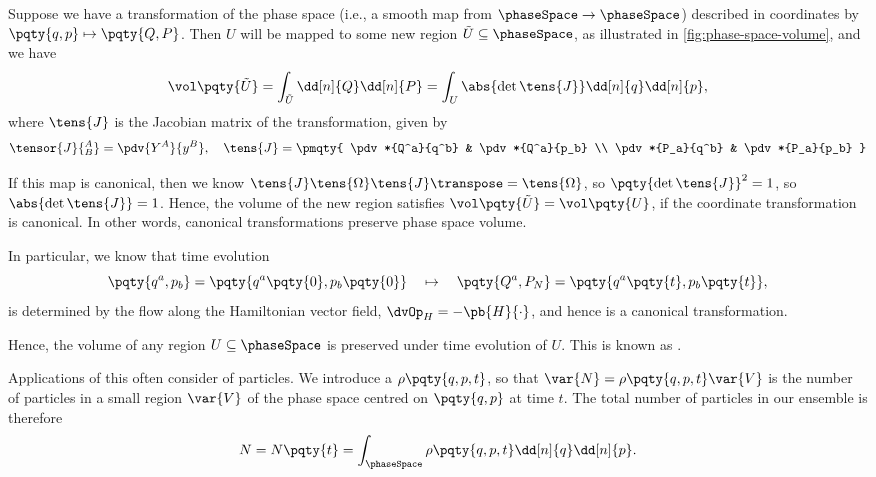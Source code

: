 Suppose we have a transformation of the phase space (i.e., a smooth map from \(\phaseSpace \to \phaseSpace\)) described in coordinates by \(\pqty{q, p} \mapsto \pqty{Q, P}\). Then \(U\) will be mapped to some new region \(\tilde{U} \subseteq \phaseSpace\), as illustrated in \autoref{fig:phase-space-volume}, and we have
\begin{equation}
    \vol\pqty{\tilde{U}} = \int_{\tilde{U}} \dd[n]{Q} \dd[n]{P} = \int_{U} \abs{\det \tens{J}} \dd[n]{q} \dd[n]{p},
\end{equation}
where \(\tens{J}\) is the Jacobian matrix of the transformation, given by
\begin{equation}
    \tensor{J}{^A_B} = \pdv{Y^A}{y^B}, \quad \tens{J} = \pmqty{
        \pdv*{Q^a}{q^b} & \pdv*{Q^a}{p_b} \\
        \pdv*{P_a}{q^b} & \pdv*{P_a}{p_b}
    }
\end{equation}

If this map is canonical, then we know \(\tens{J} \tens{\Omega} \tens{J}\transpose = \tens{\Omega}\), so \(\pqty{\det \tens{J}}^2 = 1\), so \(\abs{\det \tens{J}} = 1\). Hence, the volume of the new region satisfies \(\vol \pqty{\tilde{U}} = \vol\pqty{U}\), if the coordinate transformation is canonical. In other words, canonical transformations preserve phase space volume.

In particular, we know that time evolution
\begin{equation}
    \pqty{q^a, p_b} = \pqty{q^a \pqty{0}, p_b \pqty{0}} \quad \mapsto \quad \pqty{Q^a, P_N} = \pqty{q^a \pqty{t}, p_b \pqty{t}},
\end{equation}
is determined by the flow along the Hamiltonian vector field, \(\dvOp_H = - \pb{H}{\cdot}\), and hence is a canonical transformation.

Hence, the volume of any region \(U \subseteq \phaseSpace\) is preserved under time evolution of \(U\). This is known as .

Applications of this often consider  of particles. We introduce a  \(\rho\pqty{q, p, t}\), so that \(\var{N} = \rho\pqty{q, p, t} \var{V}\) is the number of particles in a small region \(\var{V}\) of the phase space centred on \(\pqty{q, p}\) at time \(t\). The total number of particles in our ensemble is therefore
\begin{equation}
    N = N\pqty{t} = \int_{\phaseSpace} \rho\pqty{q, p, t} \dd[n]{q} \dd[n]{p}.
\end{equation}

